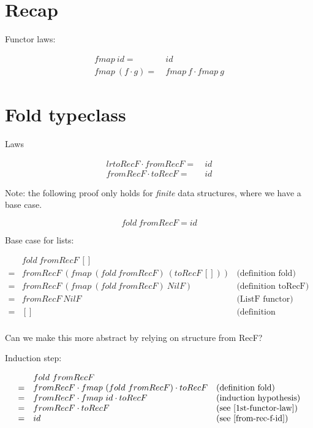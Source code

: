\documentclass[11pt]{article}
\begin{document}
\section{Recap}

Functor laws:

\begin{align}
    fmap ~ id =& ~ id
    \label{1st-functor-law} \\
    fmap ~ (f \cdot g) =& ~ fmap ~ f \cdot fmap ~ g
    \label{2nd-functor-law}
\end{align}

\section{Fold typeclass}

Laws

\begin{align}{lr}
    toRecF \cdot fromRecF =& ~ id
    \label{to-rec-f-id} \\
    fromRecF \cdot toRecF =& ~ id
    \label{from-rec-f-id}
\end{align}

Note: the following proof only holds for \emph{finite} data structures, where we
have a base case.

\begin{equation}
  fold ~ fromRecF = id
\end{equation}

Base case for lists:

\begin{equation*}
  \begin{array}{lll}
     & fold ~ fromRecF ~ [] \\
    =& fromRecF ~ (fmap ~ (fold ~ fromRecF) ~ (toRecF ~ []))
     & \text{(definition fold)} \\
    =& fromRecF ~ (fmap ~ (fold ~ fromRecF) ~ NilF)
     & \text{(definition toRecF)} \\
    =& fromRecF ~ NilF
     & \text{(ListF functor)} \\
    =& []
     & \text{(definition fromRecF)} \\
  \end{array}
\end{equation*}

Can we make this more abstract by relying on structure from RecF?

Induction step:

\begin{equation*}
  \begin{array}{lll}
     & fold ~ fromRecF \\
    =& fromRecF \cdot fmap ~ (fold ~ fromRecF) \cdot toRecF
     & \text{(definition fold)} \\
    =& fromRecF \cdot fmap ~ id \cdot toRecF
     & \text{(induction hypothesis)} \\
    =& fromRecF \cdot toRecF
     & \text{(see \ref{1st-functor-law})} \\
    =& id
     & \text{(see \ref{from-rec-f-id})} \\
  \end{array}
\end{equation*}
\end{document}
